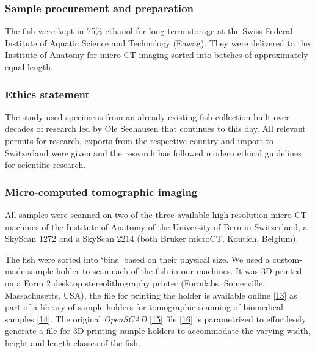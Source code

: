 \hypertarget{sample-procurement-and-preparation}{%
\subsubsection{Sample procurement and preparation}\label{sample-procurement-and-preparation}}

The fish were kept in 75\% ethanol for long-term storage at the Swiss Federal Institute of Aquatic Science and Technology (Eawag).
They were delivered to the Institute of Anatomy for micro-CT imaging sorted into batches of approximately equal length.

\hypertarget{ethics-statement}{%
\subsubsection{Ethics statement}\label{ethics-statement}}

The study used specimens from an already existing fish collection built over decades of research led by Ole Seehausen that continues to this day.
All relevant permits for research, exports from the respective country and import to Switzerland were given and the research has followed modern ethical guidelines for scientific research.

\hypertarget{micro-computed-tomographic-imaging}{%
\subsubsection{Micro-computed tomographic imaging}\label{micro-computed-tomographic-imaging}}

All samples were scanned on two of the three available high-resolution micro-CT machines of the Institute of Anatomy of the University of Bern in Switzerland, a SkyScan 1272 and a SkyScan 2214 (both Bruker microCT, Kontich, Belgium).

The fish were sorted into `bins' based on their physical size.
We used a custom-made sample-holder to scan each of the fish in our machines.
It was 3D-printed on a Form 2 desktop stereolithography printer (Formlabs, Somerville, Massachusetts, USA), the file for printing the holder is available online {[}\protect\hyperlink{ref-VCZPOv2f}{13}{]} as part of a library of sample holders for tomographic scanning of biomedical samples {[}\protect\hyperlink{ref-115PPSuQp}{14}{]}.
The original \emph{OpenSCAD} {[}\protect\hyperlink{ref-wsjdcTeC}{15}{]} file {[}\protect\hyperlink{ref-f7OzrzUv}{16}{]} is parametrized to effortlessly generate a file for 3D-printing sample holders to accommodate the varying width, height and length classes of the fish.

